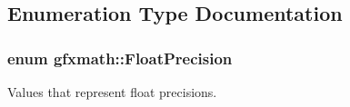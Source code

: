 \subsection{Enumeration Type Documentation}
\hypertarget{group___scalar_math_consts_gae1c17f54b4cd35725ae7e4d54d5e8b8f}{}
\subsubsection[{Float\+Precision}]{\setlength{\rightskip}{0pt plus 5cm}enum {\bf gfxmath\+::\+Float\+Precision}}\label{group___scalar_math_consts_gae1c17f54b4cd35725ae7e4d54d5e8b8f}


Values that represent float precisions. 

